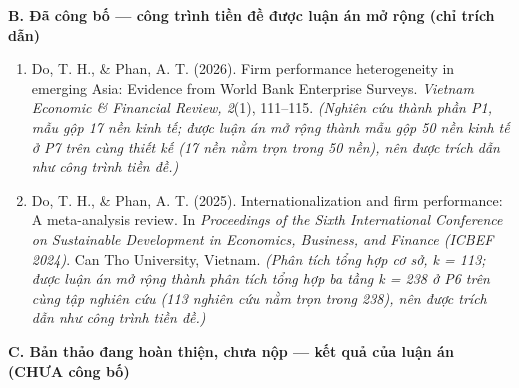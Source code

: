 \documentclass[
  a4paper,
  13pt]{extreport}
\providecommand{\tightlist}{%
  \setlength{\itemsep}{0pt}\setlength{\parskip}{0pt}}
\begin{document}
\textbf{B. Đã công bố --- công trình tiền đề được luận án mở rộng (chỉ
trích dẫn)}

\begin{enumerate}
\def\labelenumi{\arabic{enumi}.}
\setcounter{enumi}{2}
\tightlist
\item
  Do, T. H., \& Phan, A. T. (2026). Firm performance heterogeneity in
  emerging Asia: Evidence from World Bank Enterprise Surveys.
  \emph{Vietnam Economic \& Financial Review, 2}(1), 111--115.
  \emph{(Nghiên cứu thành phần P1, mẫu gộp 17 nền kinh tế; được luận án
  mở rộng thành mẫu gộp 50 nền kinh tế ở P7 trên cùng thiết kế (17 nền
  nằm trọn trong 50 nền), nên được trích dẫn như công trình tiền đề.)}
\item
  Do, T. H., \& Phan, A. T. (2025). Internationalization and firm
  performance: A meta-analysis review. In \emph{Proceedings of the Sixth
  International Conference on Sustainable Development in Economics,
  Business, and Finance (ICBEF 2024)}. Can Tho University, Vietnam.
  \emph{(Phân tích tổng hợp cơ sở, k = 113; được luận án mở rộng thành
  phân tích tổng hợp ba tầng k = 238 ở P6 trên cùng tập nghiên cứu (113
  nghiên cứu nằm trọn trong 238), nên được trích dẫn như công trình tiền
  đề.)}
\end{enumerate}

\textbf{C. Bản thảo đang hoàn thiện, chưa nộp --- kết quả của luận án
(CHƯA công bố)}
\end{document}
